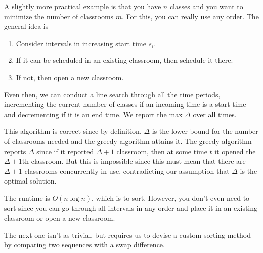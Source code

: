 \documentclass{article}
\begin{document}
  \begin{example}
    A slightly more practical example is that you have $n$ classes and you want to minimize the number of classrooms $m$. For this, you can really use any order. The general idea is 
    \begin{enumerate}
      \item Consider intervals in increasing start time $s_i$. 
      \item If it can be scheduled in an existing classroom, then schedule it there. 
      \item If not, then open a new classroom. 
    \end{enumerate}
    Even then, we can conduct a line search through all the time periods, incrementing the current number of classes if an incoming time is a start time and decrementing if it is an end time. We report the max $\Delta$ over all times. 

    This algorithm is correct since by definition, $\Delta$ is the lower bound for the number of classrooms needed and the greedy algorithm attains it. The greedy algorithm reports $\Delta$ since if it reported $\Delta +1$ classroom, then at some time $t$ it opened the $\Delta+1$th classroom. But this is impossible since this must mean that there are $\Delta + 1$ classrooms concurrently in use, contradicting our assumption that $\Delta$ is the optimal solution. 

    \begin{algorithm}[H]
      \caption{}
      \label{alg:}
      \begin{algorithmic}
        \Require{}
        \State 
        \EndFunction
      \end{algorithmic}
    \end{algorithm}

    The runtime is $O(n \log{n})$, which is to sort. However, you don't even need to sort since you can go through all intervals in any order and place it in an existing classroom or open a new classroom. 
  \end{example}

  The next one isn't as trivial, but requires us to devise a custom sorting method by comparing two sequences with a swap difference. 
\end{document}

